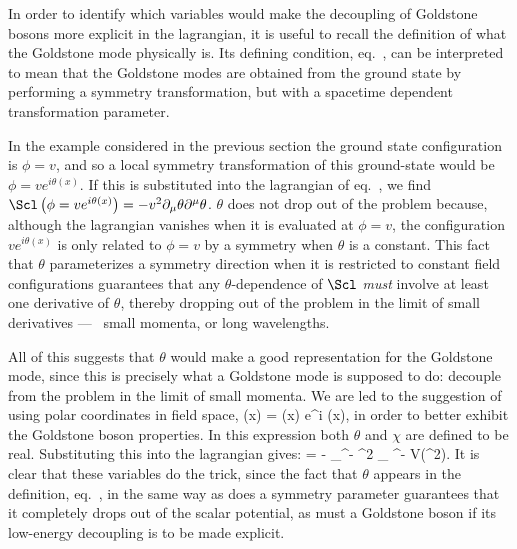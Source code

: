 \documentclass[12pt,epsf]{report}
\begin{document}
In order to identify which variables would make the
decoupling of Goldstone bosons more explicit in the
lagrangian, it is useful to recall the definition of what
the Goldstone mode physically is. Its defining condition,
eq.~, can be interpreted to mean that the
Goldstone modes are obtained from the ground state by
performing a symmetry transformation, but with a spacetime
dependent transformation parameter.

In the example considered in the previous section the
ground state configuration is $\phi = v$, and so a local
symmetry transformation of this ground-state would be $\phi
= v e^{i 
\theta(x)}$. If this is substituted into the lagrangian of 
eq.~, we find $\Scl \left( \phi = v e^{i
\theta(x)} \right) = - v^2 \partial_\mu \theta \partial^\mu
\theta$. 
$\theta$ does not drop out of the problem because, although
the lagrangian vanishes when it is evaluated at $\phi =v$,
the configuration $v e^{i\theta(x)}$ is only related to
$\phi =v$ by a symmetry when $\theta$ is a constant. This
fact that $\theta$ parameterizes a symmetry direction when
it is restricted to constant field configurations
guarantees that any $\theta$-dependence of $\Scl$ {\em
must} involve at least one derivative of $\theta$, thereby
dropping out of the problem in the limit of small
derivatives --- \ie\ small momenta, or long wavelengths.

All of this suggests that $\theta$ would make a good
representation for the Goldstone mode, since this is
precisely what a Goldstone mode is supposed to do: decouple
from the problem in the limit of small momenta. We are led
to the suggestion of using polar coordinates in field
space, 
%
\eq
\label{polcoords}
\phi(x) = \chi(x) \; e^{i \theta(x)},
\eeq
%
in order to better exhibit the Goldstone boson properties.
In this expression both $\theta$ and $\chi$ are defined to
be real. Substituting this into the lagrangian gives:
%
\eq
\label{linpolcoords}
\Scl = - \partial_\mu \chi \partial^\mu \chi - \chi^2
\partial_\mu \theta
\partial^\mu \theta - V(\chi^2).
\eeq
%
It is clear that these variables do the trick, since the
fact that $\theta$ appears in the definition,
eq.~, in the same way as does a symmetry
parameter guarantees that it completely drops out of the
scalar potential, as must a Goldstone boson if its
low-energy decoupling is to be made explicit.
\end{document}
